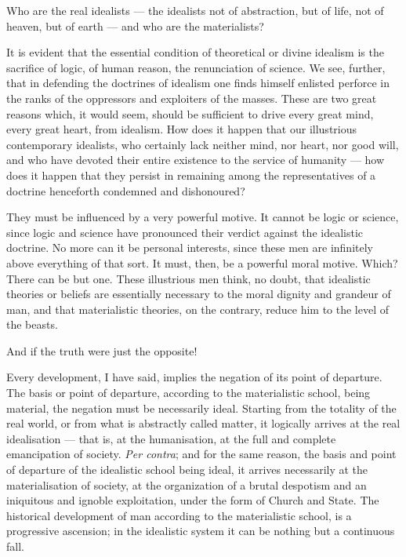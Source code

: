 \documentclass[12pt]{report}
\begin{document}
Who are the real idealists — the idealists not of abstraction, but of life, not of heaven, but of earth — and who are the materialists?


It is evident that the essential condition of theoretical or divine idealism is the sacrifice of logic, of human reason, the renunciation of science. We see, further, that in defending the doctrines of idealism one finds himself enlisted perforce in the ranks of the oppressors and exploiters of the masses. These are two great reasons which, it would seem, should be sufficient to drive every great mind, every great heart, from idealism. How does it happen that our illustrious contemporary idealists, who certainly lack neither mind, nor heart, nor good will, and who have devoted their entire existence to the service of humanity — how does it happen that they persist in remaining among the representatives of a doctrine henceforth condemned and dishonoured?


They must be influenced by a very powerful motive. It cannot be logic or science, since logic and science have pronounced their verdict against the idealistic doctrine. No more can it be personal interests, since these men are infinitely above everything of that sort. It must, then, be a powerful moral motive. Which? There can be but one. These illustrious men think, no doubt, that idealistic theories or beliefs are essentially necessary to the moral dignity and grandeur of man, and that materialistic theories, on the contrary, reduce him to the level of the beasts.


And if the truth were just the opposite!


Every development, I have said, implies the negation of its point of departure. The basis or point of departure, according to the materialistic school, being material, the negation must be necessarily ideal. Starting from the totality of the real world, or from what is abstractly called matter, it logically arrives at the real idealisation — that is, at the humanisation, at the full and complete emancipation of society. \emph{Per contra}; and for the same reason, the basis and point of departure of the idealistic school being ideal, it arrives necessarily at the materialisation of society, at the organization of a brutal despotism and an iniquitous and ignoble exploitation, under the form of Church and State. The historical development of man according to the materialistic school, is a progressive ascension; in the idealistic system it can be nothing but a continuous fall.
\end{document}
